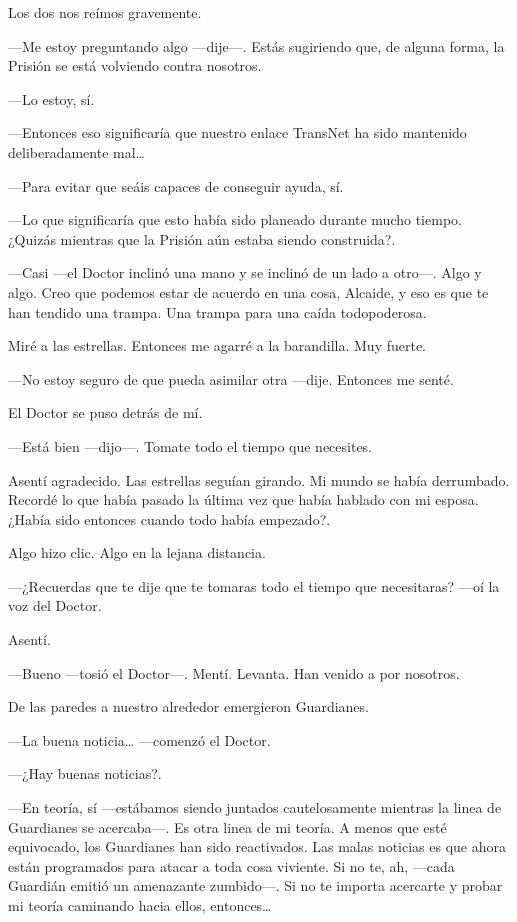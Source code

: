Los dos nos reímos gravemente.

---Me estoy preguntando algo ---dije---. Estás sugiriendo que, de alguna
forma, la Prisión se está volviendo contra nosotros.

---Lo estoy, sí.

---Entonces eso significaría que nuestro enlace TransNet ha sido
mantenido deliberadamente mal\ldots{}

---Para evitar que seáis capaces de conseguir ayuda, sí.

---Lo que significaría que esto había sido planeado durante mucho
tiempo. ¿Quizás mientras que la Prisión aún estaba siendo construida?.

---Casi ---el Doctor inclinó una mano y se inclinó de un lado a otro---.
Algo y algo. Creo que podemos estar de acuerdo en una cosa, Alcaide, y
eso es que te han tendido una trampa. Una trampa para una caída
todopoderosa.

Miré a las estrellas. Entonces me agarré a la barandilla. Muy fuerte.

---No estoy seguro de que pueda asimilar otra ---dije. Entonces me
senté.

El Doctor se puso detrás de mí.

---Está bien ---dijo---. Tomate todo el tiempo que necesites.

Asentí agradecido. Las estrellas seguían girando. Mi mundo se había
derrumbado. Recordé lo que había pasado la última vez que había hablado
con mi esposa. ¿Había sido entonces cuando todo había empezado?.

Algo hizo clic. Algo en la lejana distancia.

---¿Recuerdas que te dije que te tomaras todo el tiempo que necesitaras?
---oí la voz del Doctor.

Asentí.

---Bueno ---tosió el Doctor---. Mentí. Levanta. Han venido a por
nosotros.

De las paredes a nuestro alrededor emergieron Guardianes.

---La buena noticia\ldots{} ---comenzó el Doctor.

---¿Hay buenas noticias?.

---En teoría, sí ---estábamos siendo juntados cautelosamente mientras la
linea de Guardianes se acercaba---. Es otra linea de mi teoría. A menos
que esté equivocado, los Guardianes han sido reactivados. Las malas
noticias es que ahora están programados para atacar a toda cosa
viviente. Si no te, ah, ---cada Guardián emitió un amenazante
zumbido---. Si no te importa acercarte y probar mi teoría caminando
hacia ellos, entonces\ldots{}

